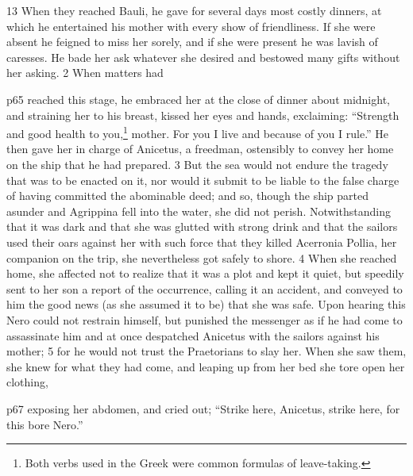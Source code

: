 13
When they reached Bauli, he gave for several days most costly dinners, at which he entertained his mother with every show of friendliness. If she were absent he feigned to miss her sorely, and if she were present he was lavish of caresses. He bade her ask whatever she desired and bestowed many gifts without her asking. 2 When matters had

p65 reached this stage, he embraced her at the close of dinner about midnight, and straining her to his breast, kissed her eyes and hands, exclaiming: ``Strength and good health to you,\texthebrew{⁠}\footnote{Both verbs used in the Greek were common formulas of leave-taking.

} mother. For you I live and because of you I rule.'' He then gave her in charge of Anicetus, a freedman, ostensibly to convey her home on the ship that he had prepared. 3 But the sea would not endure the tragedy that was to be enacted on it, nor would it submit to be liable to the false charge of having committed the abominable deed; and so, though the ship parted asunder and Agrippina fell into the water, she did not perish. Notwithstanding that it was dark and that she was glutted with strong drink and that the sailors used their oars against her with such force that they killed Acerronia Pollia, her companion on the trip, she nevertheless got safely to shore. 4 When she reached home, she affected not to realize that it was a plot and kept it quiet, but speedily sent to her son a report of the occurrence, calling it an accident, and conveyed to him the good news (as she assumed it to be) that she was safe. Upon hearing this Nero could not restrain himself, but punished the messenger as if he had come to assassinate him and at once despatched Anicetus with the sailors against his mother; 5 for he would not trust the Praetorians to slay her. When she saw them, she knew for what they had come, and leaping up from her bed she tore open her clothing,

p67 exposing her abdomen, and cried out; ``Strike here, Anicetus, strike here, for this bore Nero.''

